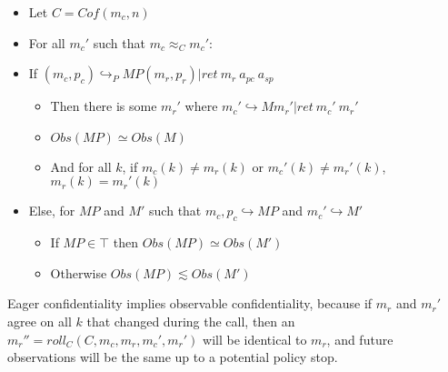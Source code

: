 \documentclass[conference]{IEEEtran}
\newcommand{\MP}{\mathit{MP}}
\begin{document}
      \begin{itemize}
        \item Let \(C = \mathit{Cof}(m_c,n)\)
        \item For all \(m_c'\) such that \(m_c \approx_C m_c'\):
        \item If \((m_c,p_c) \hookrightarrow_P \MP (m_r,p_r) | \mathit{ret}\ m_r\ a_{pc}\ a_{sp}\)
          \begin{itemize}
            \item Then there is some \(m_r'\) where
              \(m_c' \hookrightarrow M m_r' | \mathit{ret}\ m_c'\ m_r'\)
            \item \(\mathit{Obs}(\MP) \simeq \mathit{Obs}(M)\)
            \item And for all \(k\), if \(m_c(k) \not = m_r(k)\) or \(m_c'(k) \not = m_r'(k)\),
              \(m_r(k) = m_r'(k)\)
          \end{itemize}
        \item Else, for \(\MP\) and \(M'\) such that \(m_c,p_c \hookrightarrow \MP\) and \(m_c' \hookrightarrow M'\)
          \begin{itemize}
            \item If \(\MP \in \top\) then \(\mathit{Obs}(\MP) \simeq \mathit{Obs}(M')\)
            \item Otherwise \(\mathit{Obs}(\MP) \lesssim \mathit{Obs}(M')\)
          \end{itemize}
      \end{itemize}

      Eager confidentiality implies observable confidentiality, because if \(m_r\) and \(m_r'\) agree
      on all \(k\) that changed during the call, then an \(m_r'' = \mathit{roll}_C(C,m_c,m_r,m_c',m_r')\)
      will be identical to \(m_r\), and future observations will be the same up to a potential policy
      stop.
 
\end{document}
